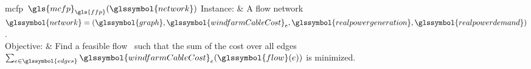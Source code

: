 \begin{problem}[framed]{\acrlong{mcfp}~$\gls{mcfp}_{\gls{ffp}}(\glssymbol{network})$
}%
    Instance: & A flow network~$
    \glssymbol{network} 
    = (
    \glssymbol{graph},
    \glssymbol{windfarmCableCost}_\edge, 
    \glssymbol{realpowergeneration}, %
    \glssymbol{realpowerdemand} %
    )$. %
    \\
    Objective: & Find a feasible flow~ such that the sum of the
    cost over all edges~$
    \sum_{\edge\in\glssymbol{edges}}
    \glssymbol{windfarmCableCost}_\edge(\glssymbol{flow}(\edge))
    $ is minimized.
\end{problem}%